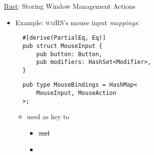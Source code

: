 \begin{frame}[fragile]{\underline{Rust}: Storing Window Management Actions \hfill {\footnotesize \currentname}}


    \begin{itemize}

        \item Example: \textsc{wmRS}'s mouse input \textit{mappings}:\\[3pt]
\begin{verbatim}
  #[derive(PartialEq, Eq)]
  pub struct MouseInput {
      pub button: Button,
      pub modifiers: HashSet<Modifier>,
  }
\end{verbatim}
\begin{verbatim}
  pub type MouseBindings = HashMap<
      MouseInput, MouseAction
  >;
\end{verbatim}

    \vspace*{5pt}\begin{itemize}

        \item {} used as key to 
            \begin{itemize}
                \item \sout<2>{ and } 
                \item {} 
            \end{itemize}

    \end{itemize}

    \end{itemize}

    \vfill

\end{frame}

